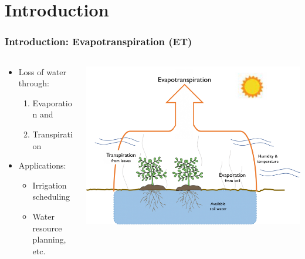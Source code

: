\section{Introduction}
\begin{frame}
\frametitle{Introduction: Evapotranspiration (ET)}
\begin{columns}
	\begin{column}{0.5\textwidth}
		\begin{itemize}
		\setlength\itemsep{1em}
		\item Loss of water through:\\
			\begin{enumerate}
				\setlength\itemsep{1em}
				\item Evaporation and 
				\item Transpiration
			\end{enumerate}
		\item Applications:\\
			\begin{itemize}
				\setlength\itemsep{1em}
				\item Irrigation scheduling
				\item Water resource planning, etc.
			\end{itemize}
		\end{itemize}
	\end{column}
	\begin{column}{0.5\textwidth}
		\includegraphics[width=\textwidth]{images/evapotranspiration.png}
	\end{column}
\end{columns}
\end{frame}

